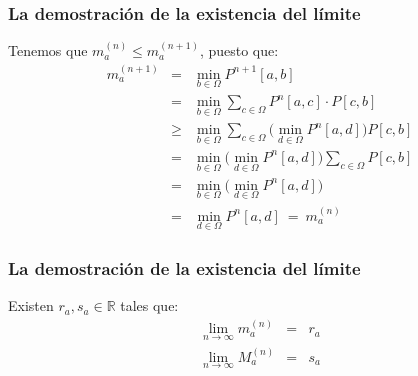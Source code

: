 \begin{frame}
\frametitle{La demostración de la existencia del límite}

{\footnotesize

Tenemos que $m_a^{(n)} \leq m_a^{(n+1)}$, puesto que:
\begin{eqnarray*}
m_a^{(n+1)} & = & \min_{b \in \Omega} P^{n+1}[a, b] \\
& = & \min_{b \in \Omega} \sum_{c \in \Omega} P^n[a, c] \cdot P[c, b] \\
& \geq & \min_{b \in \Omega} \sum_{c \in \Omega} \bigg(\min_{d \in \Omega} P^n[a, d]\bigg) P[c, b] \\
& = & \min_{b \in \Omega} \bigg(\min_{d \in \Omega} P^n[a, d]\bigg) \sum_{c \in \Omega} P[c, b] \\
& = & \min_{b \in \Omega} \bigg(\min_{d \in \Omega} P^n[a, d]\bigg)\\
& = & \min_{d \in \Omega} P^n[a, d] \ = \ m_a^{(n)}
\end{eqnarray*}



}

\end{frame}


\begin{frame}
\frametitle{La demostración de la existencia del límite}

{\footnotesize

\begin{lema}
Existen $r_a, s_a \in \mathbb{R}$ tales que:
\begin{eqnarray*}
\lim_{n \to \infty} m_a^{(n)} & = & r_a\\
\lim_{n \to \infty} M_a^{(n)} & = & s_a
\end{eqnarray*}
\end{lema}



}

\end{frame}


